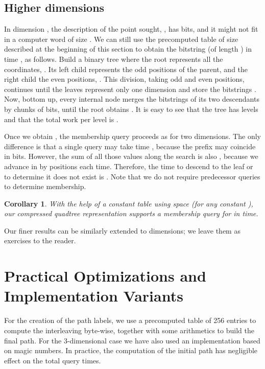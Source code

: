 \documentclass{elsarticle}
\newtheorem{corollary}[theorem]{Corollary}
\begin{document}
\subsection{Higher dimensions}

In dimension , the description of the point sought, , has  bits, and it might not fit in a computer word of size . We can still use the precomputed table of size  described at the beginning of this section to obtain the bitstring  (of length ) in time , as follows. Build a binary tree where the root represents all the  coordinates, . Its left child represents the odd positions of the parent,  and the right child the even positions, . This division, taking odd and even positions, continues until the leaves represent only one dimension  and store the bitstrings . Now, bottom up, every internal node merges the bitstrings of its two descendants by chunks of  bits,  until the root obtains . It is easy to see that the tree has  levels and that the total work per level is .

Once we obtain , the membership query proceeds as for two dimensions. The only difference is that a single  query may take time , because the prefix may coincide in  bits. However, the sum of all those  values along the search is also , because we advance in  by  positions each time. Therefore, the time to descend to the leaf  or to determine it does not exist is . Note that we do not require predecessor queries to determine membership.

\begin{corollary}
With the help of a constant table using  space (for any constant ), our compressed quadtree representation supports a membership query for  in  time.
\end{corollary}

Our finer results can be similarly extended to  dimensions; we leave them
as exercises to the reader.

\section{Practical Optimizations and Implementation Variants}
\label{sec:practice}

For the creation of the path labels, we use a precomputed table of 256 entries to compute the interleaving byte-wise, together with some arithmetics to build the final path. For the 3-dimensional case we have also used an implementation based on magic numbers. In practice, the computation of the initial path has negligible effect on the total query times.
\end{document}
